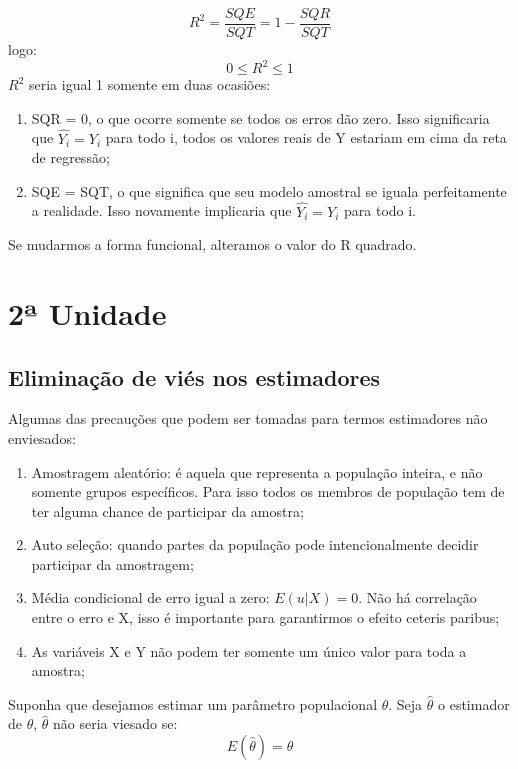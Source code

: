 \documentclass[12pt,a4paper,oneside,brazil]{abntex2}
\begin{document}
 \begin{equation}\label{R quadrado}
 R^2 = \frac{SQE}{SQT} = 1- \frac{SQR}{SQT}
 \end{equation}
 logo:
 \[ 0 \leq R^2 \leq 1\]
 $R^2$ seria igual 1 somente em duas ocasiões:
 \begin{enumerate}
 \item SQR = 0, o que ocorre somente se todos os erros dão zero. Isso significaria que $\hat{Y_i} = Y_i$ para todo i, todos os valores reais de Y estariam em cima da reta de regressão;
 \item SQE = SQT, o que significa que seu modelo amostral se iguala perfeitamente a realidade. Isso novamente implicaria que $\hat{Y_i} = Y_i$ para todo i.
 \end{enumerate}
 
 Se mudarmos a forma funcional, alteramos o valor do R quadrado.

\chapter{2ª Unidade}

\section{Eliminação de viés nos estimadores} 
Algumas das precauções que podem ser tomadas para termos estimadores não enviesados:

\begin{enumerate}
	\item Amostragem aleatório: é aquela que representa a população inteira, e não somente grupos específicos. Para isso todos os membros de  população tem de ter alguma chance de participar da amostra;
	\item Auto seleção: quando partes da população pode intencionalmente decidir participar da amostragem;
	\item Média condicional de erro igual a zero: $E(u|X) = 0$. Não há correlação entre o erro e X, isso é importante para garantirmos o efeito ceteris paribus;
	\item As variáveis X e Y não podem ter somente um único valor para toda a amostra;

\end{enumerate}

Suponha que desejamos estimar um parâmetro populacional $\theta$. Seja $\hat{\theta}$ o estimador de $\theta$, $\hat{\theta}$ não seria viesado se:
\begin{equation}
    \label{vies}
  E(\hat{\theta}) = \theta
\end{equation}
\end{document}
